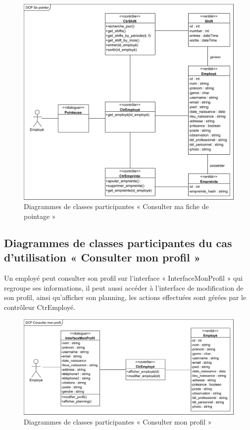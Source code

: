             \begin{figure}[h!]
                 \centering
                \includegraphics[scale=0.84]{images/DCP/DCP Se pointer.png}
                 \caption{Diagrammes de classes participantes « Consulter ma fiche de pointage »}
                 \label{fig24}
            \end{figure}
            
        \subsection*{Diagrammes de classes participantes du cas d'utilisation « Consulter mon profil »}
            Un employé peut consulter son profil sur l’interface « InterfaceMonProfil » qui regroupe ses informations, il peut aussi accéder à l’interface de modification de son profil, ainsi qu’afficher son planning, les actions effectuées sont gérées par le contrôleur CtrEmployé.  

            
            \begin{figure}[h!]
                 \centering
                \includegraphics[scale=0.7]{images/DCP/DCP consulter_mon_profil.png}
                 \caption{Diagrammes de classes participantes « Consulter mon profil »}
                 \label{fig25}
            \end{figure}
        
